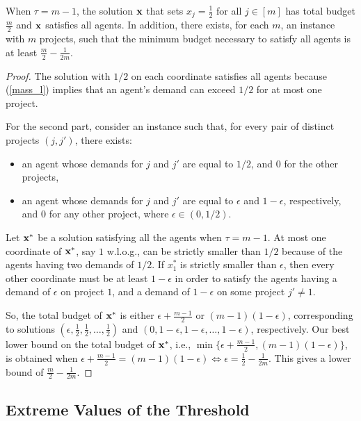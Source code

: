 \documentclass{article}
\begin{document}
\begin{theorem} When $\tau=m-1$, the solution ${\bf x} $ that sets $x_j=\frac{1}{2}$ for all
$j\in[m]$ has total budget $\frac{m}{2}$ and ${\bf x}$ satisfies all agents. In addition,  there exists, for each $m$,  an instance with $m$ projects, such
that the minimum budget necessary to satisfy all agents is at least
$\frac{m}{2}-\frac{1}{2m}$.  \end{theorem}
\begin{proof}
The solution with $1/2$ on each coordinate satisfies all agents because (\ref{mass_l}) implies that  an agent's demand can exceed $1/2$ for at most one project. 

For the second part,  consider an instance such that, for every pair of distinct projects $(j,j')$, there exists:
\begin{itemize}
\item an agent whose demands for $j$ and $j'$ are equal to $1/2$, and 0 for the other projects, 
\item an agent whose demands for $j$ and $j'$ are equal to $\epsilon$ and  $1-\epsilon$, respectively, and 0 for any other project,  where $\epsilon \in (0,1/2)$. 
\end{itemize}
Let ${\bf x}^*$ be a solution satisfying all the agents when $\tau=m-1$.  
At most one coordinate of ${\bf x^*}$, say $1$ w.l.o.g., can be strictly smaller than $1/2$ because of the agents having two demands of $1/2$. If $x^*_1$ is strictly smaller than $\epsilon$, then every other coordinate must be at least $1-\epsilon$ in order to satisfy the agents having a demand of $\epsilon$ on project $1$, and a demand of $1-\epsilon$ on some project $j'\neq 1$.     

So, the total budget of ${\bf x^*}$ is either  $\epsilon + \frac{m-1}{2}$ or $(m-1)(1-\epsilon)$, corresponding to solutions $(\epsilon,\frac{1}{2},\frac{1}{2},\ldots,\frac{1}{2})$ and $(0,1-\epsilon,1-\epsilon,\ldots,1-\epsilon)$, respectively. Our best lower bound on the total budget of ${\bf x^*}$, i.e., $\min \{\epsilon + \frac{m-1}{2},(m-1)(1-\epsilon)\}$, is obtained when $\epsilon + \frac{m-1}{2}=(m-1)(1-\epsilon) \Leftrightarrow \epsilon=\frac{1}{2}-\frac{1}{2m}$. This gives a lower bound of $\frac{m}{2}-\frac{1}{2m}$.  
\end{proof}


 \subsection{Extreme Values of the Threshold} \label{sec:extreme:minbudget}
\end{document}
